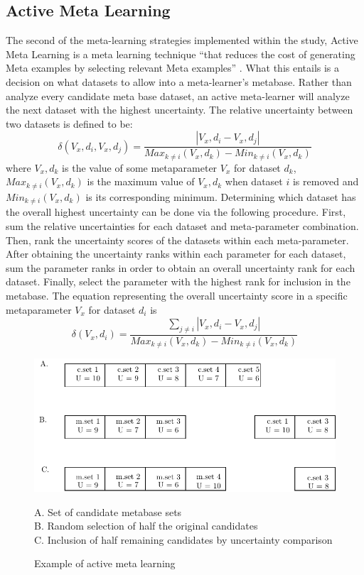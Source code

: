 \subsection{Active Meta Learning}
The second of the meta-learning strategies implemented within the study, Active
Meta Learning is a meta learning technique  ``that reduces the cost of
generating Meta examples by selecting relevant Meta examples'' \cite{Bhatt}.
What this entails is a decision on what datasets to allow into a meta-learner's
metabase. Rather than analyze every candidate meta base dataset, an active
meta-learner will analyze the next dataset with the highest uncertainty. The
relative uncertainty between two datasets is defined to be:
$$\delta(V_x,d_i,V_x,d_j) = \frac{|V_x,d_i - V_x,d_j|}{Max_{k\neq i}(V_x,d_k)- Min_{k\neq i}(V_x,d_k)}$$
where $V_x,d_k$ is the value of some metaparameter $V_x$ for dataset $d_k$,
$Max_{k\neq i}(V_x,d_k)$ is the maximum value of $V_x,d_k$ when dataset $i$ is
removed and $Min_{k\neq i}(V_x,d_k)$ is its corresponding minimum. Determining
which dataset has the overall highest uncertainty can be done via the following
procedure. First, sum the relative uncertainties for each dataset and
meta-parameter combination. Then, rank the uncertainty scores of the datasets within
each meta-parameter. After obtaining the uncertainty ranks within each parameter
for each dataset, sum the parameter ranks in order to obtain an overall
uncertainty rank for each dataset. Finally, select the parameter with the
highest rank for inclusion in the metabase. The equation representing the
overall uncertainty score in a specific metaparameter $V_x$ for dataset $d_i$ is
$$\delta(V_x,d_i) = \frac{\sum_{j\neq i} |V_x,d_i - V_x,d_j|}{Max_{k\neq i}(V_x,d_k)- Min_{k\neq i}(V_x,d_k)}$$
\begin{figure}[h]
\includegraphics{Chapters/Images/ActiveLearner/ActiveLearner.pdf}
\caption{Example of active meta learning}
\centering
A. Set of candidate metabase sets \\
B. Random selection of half the original candidates \\
C. Inclusion of half remaining candidates by uncertainty comparison \\
\end{figure}

